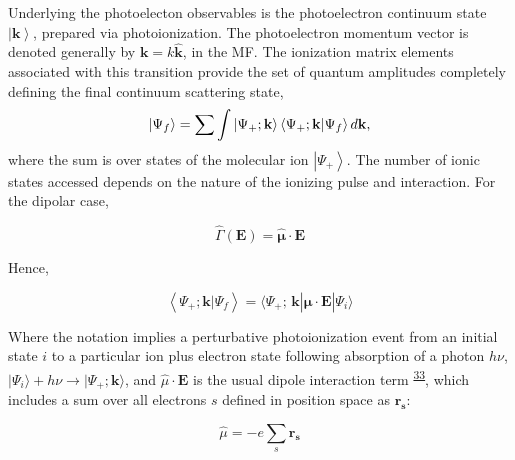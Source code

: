 \documentclass[10pt]{article}
\begin{document}
Underlying the photoelecton observables is the photoelectron continuum state $\left|\mathbf{k}\right>$, prepared via photoionization.
The photoelectron momentum vector is denoted generally by $\boldsymbol{\mathbf{k}}=k\mathbf{\hat{k}}$, in the MF. %
The ionization matrix elements associated with this transition %
provide the set of quantum amplitudes completely defining the final continuum scattering state,
\begin{equation}
\left|\Psi_f\right> = \sum{\int{\left|\Psi_{+};\bf{k}\right>\left<\Psi_{+};\mathbf{k}|\Psi_f\right> d\bf{k}}},
\label{eq:cstate}
\end{equation}
where the sum is over states of the molecular ion $\left|\Psi_{+}\right>$. The number of ionic states accessed depends on the nature of the ionizing pulse and interaction. For the dipolar case,

\begin{equation}
\hat{\Gamma}(\boldsymbol{\mathbf{E}}) = \hat{\mathbf{\mu}}\cdot\boldsymbol{\mathbf{E}}
\end{equation}

Hence,

\begin{equation}
\left<\Psi_{+};\mathbf{k}|\Psi_f\right> =\langle\Psi_{+};\,\mathbf{k}|\hat{\mathbf{\mu}}\cdot\boldsymbol{\mathbf{E}}|\Psi_{i}\rangle
\label{eq:matE-dipole}
\end{equation}

Where the notation implies a perturbative photoionization event from an initial state $i$ to a particular ion plus electron state following absorption of a photon $h\nu$, %
$|\Psi_{i}\rangle+h\nu{\rightarrow}|\Psi_{+};\boldsymbol{\mathbf{k}}\rangle$, and $\hat{\mu}\cdot\boldsymbol{\mathbf{E}}$ is the usual dipole interaction term \textsuperscript{\hyperref[csl:33]{33}}, which includes a sum over all electrons $s$ defined in position space as $\mathbf{r_{s}}$:  

\begin{equation}
\hat{\mu}=-e\sum_{s}\mathbf{r_{s}}
\label{eq:dipole-operator}
\end{equation}
\end{document}
